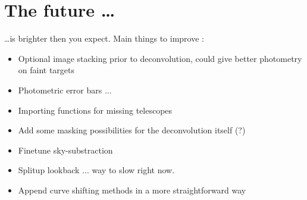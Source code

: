 



\section{The future \ldots}

\ldots is brighter then you expect. Main things to improve :


\begin{itemize}

\item Optional image stacking prior to deconvolution, could give better photometry on faint targets

\item Photometric error bars ...

\item Importing functions for missing telescopes

\item Add some masking possibilities for the deconvolution itself (?)

\item Finetune sky-substraction

\item Splitup lookback ... way to slow right now.

\item Append curve shifting methods in a more straightforward way

\end{itemize}

